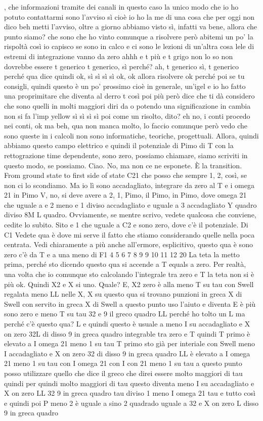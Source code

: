 \begin{soluzione}
   , che informazioni tramite dei canali in questo caso la unico modo che io ho potuto contattarmi sono l'avviso sì cioè io ho la me di una cosa che per oggi non dico beh metti l'avviso, oltre a giorno abbiamo visto sì, infatti va bene, allora che punto siamo? che sono che ho vinto comunque a risolvere però abitemi un po' la rispoltà così io capisco se sono in calco e ci sono le lezioni di un'altra cosa lele di estremi di integrazione vanno da zero ahhh e t più e t grigo non lo so non dovrebbe essere t generico t generico, sì perché? ah, t generico sì, t generico perché qua dice quindi ok, sì sì sì sì ok, ok allora risolvere ok perché poi se tu consigli, quindi questo è un po' prossimo cioè in generale, un'igel e io ho fatto una proprimitare che diventa al derro t così poi più però dice che ti dà considero che sono quelli in molti maggiori diri da o potendo una significazione in cambia non si fa l'imp yellow sì sì sì sì poi come un risolto, dito? eh no, i conti procedo nei conti, ok ma beh, qua non manca molto, lo faccio comunque però vedo che sono queste in i calcoli non sono informatiche, teoriche, progettuali. Allora, quindi abbiamo questo campo elettrico e quindi il potenziale di Pimo di T con la rettograzione time dependente, sono zero, possiamo chiamare, siamo scriviti in questo modo, se possiamo. Ciao. No, ma non ce ne esponete. È la transition. From ground state to first side of state C21 che posso che sempre 1, 2, così, se non ci lo scondiamo. Ma io lì sono accadagliato, integrare da zero al T e i omega 21 in Pimo V, no, si deve avere a 2, 1, Pimo, il Pimo, in Pimo, dove omega 21 che uguale a e 2 meno e 1 diviso accadagliato e uguale a 3 accadagliato Y quadro diviso 8M L quadro. Ovviamente, se mentre scrivo, vedete qualcosa che conviene, cedite lo subito. Sito e 1 che uguale a C2 e sono zero, dove c'è il potenziale. Di C1 Vedete qua è dove mi serve il fatto che stiamo considerando quelle nella poca centrata. Vedi chiaramente a più anche all'ermore, esplicitivo, questo qua è sono zero c'è da T e a una meno di F1 4 5 6 7 8 9 9 10 11 12 20 La teta la metto prima, perché sto dicendo questo qua si accende a T equals a zero. Per realtà, una volta che io comunque sto calcolando l'integrale tra zero e T la teta non si è più ok. Quindi X2 e X si uno. Quale? E, X2 zero è alla meno T su tau con Swell regalata meno LL nelle X, X su questo qua si trovano punzioni in greca X di Swell con servito in greca X di Swell a questo punto uso l'aiuto e diventa E è più sono zero e meno T su tau 32 e 9 il greco quadro LL perché ho tolto un L ma perché c'è questo qua? L e quindi questo è usuale a meno I su accadagliato e X on zero 32L di disso 9 in greca quadro integrable tra zero e T quindi T primo è elevato a I omega 21 meno 1 su tau T primo sto già per interiale con Swell meno I accadagliato e X on zero 32 di disso 9 in greca quadro LL è elevato a I omega 21 meno 1 su tau con I omega 21 con I con 21 meno 1 su tau a questo punto posso utilizzare quello che dice il greco che direi essere molto maggiori di tau quindi per quindi molto maggiori di tau questo diventa meno I su accadagliato e X on zero LL 32 9 in greca quadro tau diviso 1 meno I omega 21 tau e tutto così e quindi poi P meno 2 è uguale a sino 2 quadrado uguale a 32 e X on zero L disso 9 in greca quadro 
\end{soluzione}
